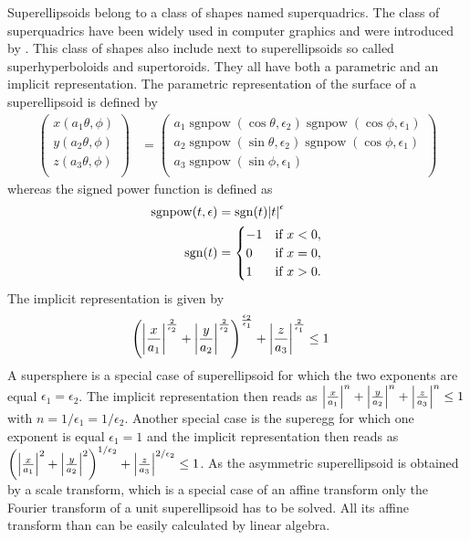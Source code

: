 Superellipsoids belong to a class of shapes named superquadrics. The class of superquadrics have been widely used in computer graphics and were introduced by \cite{Barr1981}. This class of shapes also include next to superellipsoids so called superhyperboloids and supertoroids. They all have both a
parametric and an implicit representation. The parametric representation of the surface of a superellipsoid is defined by
\begin{align}\label{eq:superellipsoid:parametric}
  \left(
    \begin{array}{c}
      x(a_1\theta,\phi) \\
      y(a_2\theta,\phi) \\
      z(a_3\theta,\phi) \\
    \end{array}
  \right)
 &=
 \left(
    \begin{array}{c}
     a_1 \operatorname{sgnpow}(\cos\theta,\epsilon_2)\operatorname{sgnpow}(\cos\phi,\epsilon_1)  \\
     a_2 \operatorname{sgnpow}(\sin\theta,\epsilon_2)\operatorname{sgnpow}(\cos\phi,\epsilon_1)  \\
     a_3 \operatorname{sgnpow}(\sin\phi,\epsilon_1) \\
    \end{array}
  \right)
\end{align}
whereas the signed power function is defined as
\begin{align}\label{eq:sgnpow}
  \operatorname{sgnpow}(t,\epsilon) &= \operatorname{sgn}(t)\abs{t}^\epsilon \\
  \operatorname{sgn}(t) &=
  \begin{cases}
    -1&{\text{if }}x<0,\\
     0&{\text{if }}x=0,\\
     1&{\text{if }}x>0.
  \end{cases}
\end{align}
The implicit representation is given by
\begin{align}\label{eq:superellipsoid:implicit}
\left(
     \abs{\frac{x}{a_1}}^{\frac{2}{\epsilon_2}}+
     \abs{\frac{y}{a_2}}^{\frac{2}{\epsilon_2}}
\right)^{\frac{\epsilon_2}{\epsilon_1}} +
\abs{\frac{z}{a_3}}^{\frac{2}{\epsilon_1}} &\leq 1
\end{align}
A supersphere is a special case of superellipsoid for which the two exponents are equal $\epsilon_1=\epsilon_2$. The implicit representation then reads as
$\abs{\frac{x}{a_1}}^n+\abs{\frac{y}{a_2}}^n+\abs{\frac{z}{a_3}}^n\leq 1$ with $n=1/\epsilon_1=1/\epsilon_2$.
Another special case is the superegg for which one exponent is equal $\epsilon_1=1$ and the implicit representation then reads as
$\left(\abs{\frac{x}{a_1}}^2+\abs{\frac{y}{a_2}}^2\right)^{1/\epsilon_2}+\abs{\frac{z}{a_3}}^{2/\epsilon_2}\leq 1$.
As the asymmetric superellipsoid is obtained by a scale transform, which is a special case of an affine transform only the Fourier transform of a unit superellipsoid has to be solved. All its affine transform than can be easily calculated by linear algebra.


